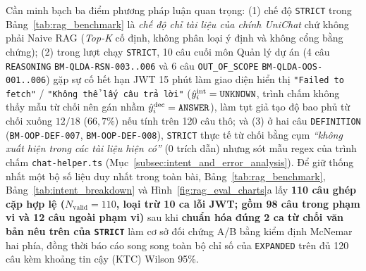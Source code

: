 \documentclass{IEEEtran}
\begin{document}
Cần minh bạch ba điểm phương pháp luận quan trọng: (1) chế độ \texttt{STRICT} trong Bảng~\ref{tab:rag_benchmark} là \textit{chế độ chỉ tài liệu của chính UniChat} chứ không phải Naive RAG (\textit{Top-K} cố định, không phân loại ý định và không cổng bằng chứng); (2) trong lượt chạy \texttt{STRICT}, 10 câu cuối môn Quản lý dự án (4 câu \texttt{REASONING} \texttt{BM-QLDA-RSN-003..006} và 6 câu \texttt{OUT\_OF\_SCOPE} \texttt{BM-QLDA-OOS-001..006}) gặp sự cố hết hạn JWT 15 phút làm giao diện hiển thị \texttt{"Failed to fetch"} / \texttt{"Không thể lấy câu trả lời"} ($\hat{y}_i^{\text{int}} = \text{\texttt{UNKNOWN}}$, trình chấm không thấy mẫu từ chối nên gán nhầm $\hat{y}_i^{\text{dec}} = \text{\texttt{ANSWER}}$), làm tụt giả tạo độ bao phủ từ chối xuống $12/18$ ($66{,}7\%$) nếu tính trên 120 câu thô; và (3) ở hai câu \texttt{DEFINITION} (\texttt{BM-OOP-DEF-007}, \texttt{BM-OOP-DEF-008}), \texttt{STRICT} thực tế từ chối bằng cụm \textit{``không xuất hiện trong các tài liệu hiện có''} ($0$ trích dẫn) nhưng sót mẫu regex của trình chấm \texttt{chat-helper.ts} (Mục~\ref{subsec:intent_and_error_analysis}). Để giữ thống nhất một bộ số liệu duy nhất trong toàn bài, Bảng~\ref{tab:rag_benchmark}, Bảng~\ref{tab:intent_breakdown} và Hình~\ref{fig:rag_eval_charts}a lấy \textbf{110 câu ghép cặp hợp lệ ($N_{\text{valid}} = 110$, loại trừ 10 ca lỗi JWT; gồm 98 câu trong phạm vi và 12 câu ngoài phạm vi)} sau khi \textbf{chuẩn hóa đúng 2 ca từ chối văn bản nêu trên của \texttt{STRICT}} làm cơ sở đối chứng A/B bằng kiểm định McNemar hai phía, đồng thời báo cáo song song toàn bộ chỉ số của \texttt{EXPANDED} trên đủ 120 câu kèm khoảng tin cậy (KTC) Wilson 95\%.
\end{document}
